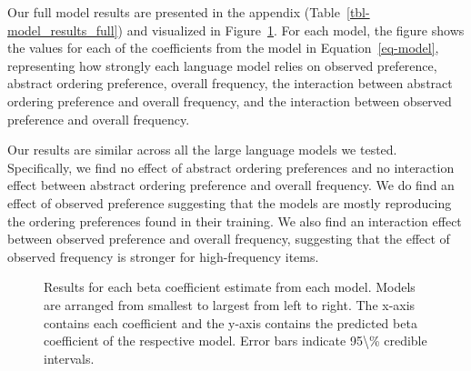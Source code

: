 \documentclass[
  12pt,
  letterpaper,
]{scrreprt}
\begin{document}
Our full model results are presented in the appendix
(Table~\ref{tbl-model_results_full}) and visualized in
Figure~\ref{fig-results}. For each model, the figure shows the values
for each of the coefficients from the model in Equation~\ref{eq-model},
representing how strongly each language model relies on observed
preference, abstract ordering preference, overall frequency, the
interaction between abstract ordering preference and overall frequency,
and the interaction between observed preference and overall frequency.

Our results are similar across all the large language models we tested.
Specifically, we find no effect of abstract ordering preferences and no
interaction effect between abstract ordering preference and overall
frequency. We do find an effect of observed preference suggesting that
the models are mostly reproducing the ordering preferences found in
their training. We also find an interaction effect between observed
preference and overall frequency, suggesting that the effect of observed
frequency is stronger for high-frequency items.

\begin{figure}[htbp]

\caption{\label{fig-results}Results for each beta coefficient estimate
from each model. Models are arranged from smallest to largest from left
to right. The x-axis contains each coefficient and the y-axis contains
the predicted beta coefficient of the respective model. Error bars
indicate 95\textbackslash\% credible intervals.}


\end{figure}%
\end{document}
